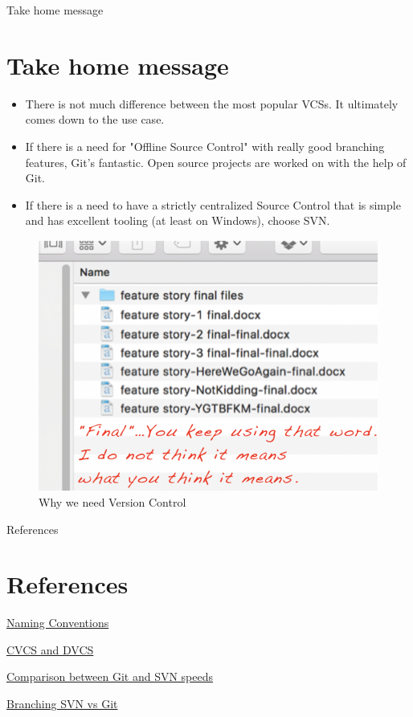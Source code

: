 \documentclass{beamer}
\begin{document}
\begin{frame}{Take home message}
\section{Take home message}
\begin{itemize}
    \item There is not much difference between the most popular VCSs. It ultimately comes down to the use case.
    \item If there is a need for "Offline Source Control" with really good branching features, Git's fantastic. Open source projects are worked on with the help of Git. 
    \item If there is a need to have a strictly centralized Source Control that is simple and has excellent tooling (at least on Windows), choose SVN.
\end{itemize}
    \begin{figure}
    	\includegraphics[scale=0.17]{images/final-final}
    	\caption{Why we need Version Control\cite{naming-conv}}
    \end{figure}
\end{frame}

\begin{frame}{References}
  \section{References}
    
  \begin{thebibliography}{10}


	\href{https://doctorfreelance.com/file-naming-conventions/}{Naming Conventions}

	\href{https://www.appfusions.com/display/StashSCMImporter/CVCS+vs.+DVCS+In+a+Nutshell
}{CVCS and DVCS}

\href{https://git-scm.com/about/small-and-fast}{Comparison between Git and SVN speeds}
	
	\href{https://stackoverflow.com/questions/2471606/how-and-or-why-is-merging-in-git-better-than-in-svn
	}{Branching SVN vs Git}
	



  \end{thebibliography}
\end{frame}
\end{document}
